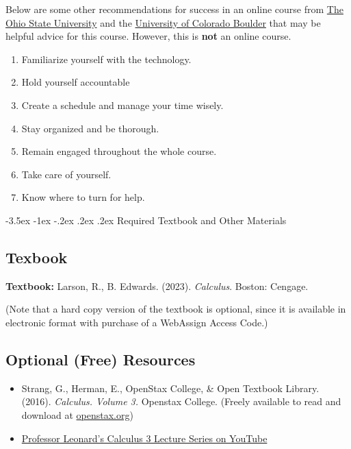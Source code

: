 \documentclass{article}
\makeatletter
\renewcommand\section{\@startsection{section}{1}{0pt}%
  {-3.5ex \@plus -1ex \@minus -.2ex}%
  {.2ex \@plus.2ex}%
  {\normalfont\Large\bfseries}} %
\makeatother
\begin{document}
Below are some other recommendations for success in an online course from \href{https://online.osu.edu/resources/learn/5-online-learning-tips-student-success}{The Ohio State University} and the \href{https://www.colorado.edu/health/tips-succeeding-online-classes}{University of Colorado Boulder} that may be helpful advice for this course. However, this is \textbf{not} an online course.

\begin{enumerate}
\item Familiarize yourself with the technology.
\item Hold yourself accountable
\item Create a schedule and manage your time wisely.
\item Stay organized and be thorough.
\item Remain engaged throughout the whole course.
\item Take care of yourself.
\item Know where to turn for help.
\end{enumerate}

\section{Required Textbook and Other Materials}

\subsection{Texbook}

\textbf{Textbook:} Larson, R., B. Edwards. (2023). \textit{Calculus}. Boston: Cengage.

(Note that a hard copy version of the textbook is optional, since it is available in electronic format with purchase of a WebAssign Access Code.)

\subsection{Optional (Free) Resources}

\begin{itemize}
\item Strang, G., Herman, E., OpenStax College, \& Open Textbook Library. (2016). \textit{Calculus. Volume 3.} Openstax College. (Freely available to read and download at \href{https://openstax.org/details/books/calculus-volume-3}{openstax.org})


\item \href{https://www.youtube.com/watch?v=tGVnBAHLApA\&list=PLDesaqWTN6ESk16YRmzuJ8f6-rnuy0Ry7\&index=1}{Professor Leonard's Calculus 3 Lecture Series on YouTube}
\end{itemize}
\end{document}
